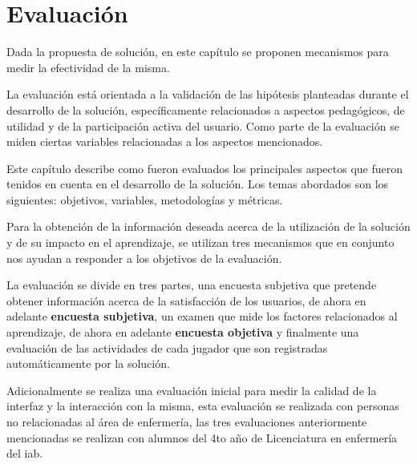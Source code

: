 \chapter{Evaluación}

Dada la propuesta de solución, en este capítulo se proponen mecanismos para medir la
efectividad de la misma.

La evaluación está orientada a la validación de las hipótesis planteadas durante
el desarrollo de la solución, específicamente relacionados a aspectos
pedagógicos, de utilidad y de la participación activa del usuario. Como parte de
la evaluación se miden ciertas variables relacionadas a los aspectos
mencionados.

Este capítulo describe como fueron evaluados los principales aspectos que fueron
tenidos en cuenta en el desarrollo de la solución. Los temas abordados son los
siguientes: objetivos, variables, metodologías y métricas. 

Para la obtención de la información deseada acerca de la utilización de la
solución y de su impacto en el aprendizaje, se utilizan tres mecanismos que en
conjunto nos ayudan a responder a los objetivos de la evaluación.

La evaluación se divide en tres partes, una encuesta subjetiva que pretende
obtener información acerca de la satisfacción de los usuarios, de ahora en
adelante \textbf{encuesta subjetiva}, un examen que mide los factores
relacionados al aprendizaje, de ahora en adelante \textbf{encuesta objetiva}  y
finalmente una evaluación de las actividades de cada jugador que son registradas
automáticamente por la solución.

Adicionalmente se realiza una evaluación inicial para medir la calidad de la
interfaz y la interacción con la misma, esta evaluación se realizada con
personas no relacionadas al área de enfermería, las tres evaluaciones
anteriormente mencionadas se realizan con alumnos del 4to año de Licenciatura en
enfermería del \Gls{iab}.







